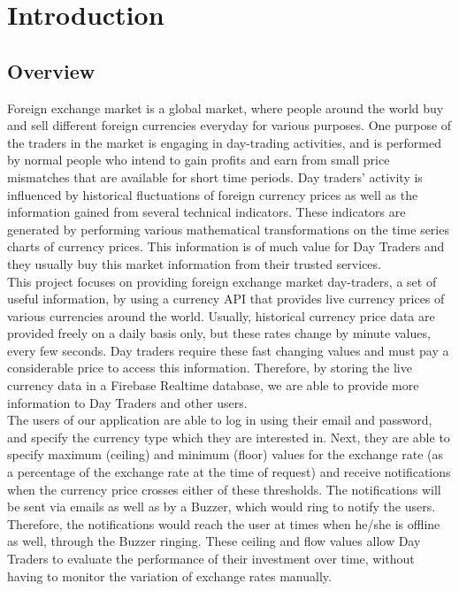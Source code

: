 \newpage


\section{Introduction}

\subsection{Overview}

Foreign exchange market is a global market, where people around the world buy and sell different foreign currencies everyday for various purposes. One purpose of the traders in the market is engaging in day-trading activities, and is performed by normal people who intend to gain profits and earn from small price mismatches that are available for short time periods. Day traders’ activity is influenced by historical fluctuations of foreign currency prices as well as the information gained from several technical indicators. These indicators are generated by performing various mathematical transformations on the time series charts of currency prices. This information is of much value for Day Traders and they usually buy this market information from their trusted services.\\

This project focuses on providing foreign exchange market day-traders, a set of useful information, by using a currency API that provides live currency prices of various currencies around the world. Usually, historical currency price data are provided freely on a daily basis only, but these rates change by minute values, every few seconds. Day traders require these fast changing values and must pay a considerable price to access this information. Therefore, by storing the live currency data in a Firebase Realtime database, we are able to provide more information to Day Traders and other users.\\

The users of our application are able to log in using their email and password, and specify the currency type which they are interested in. Next, they are able to specify maximum (ceiling) and minimum (floor) values for the exchange rate (as a percentage of the exchange rate at the time of request) and receive notifications when the currency price crosses either of these thresholds. The notifications will be sent via emails as well as by a  Buzzer, which would ring to notify the users. Therefore,  the notifications would reach the user at times when he/she is offline as well, through the Buzzer ringing. These ceiling and flow values allow Day Traders to evaluate the performance of their investment over time, without having to monitor the variation of exchange rates manually.\\

